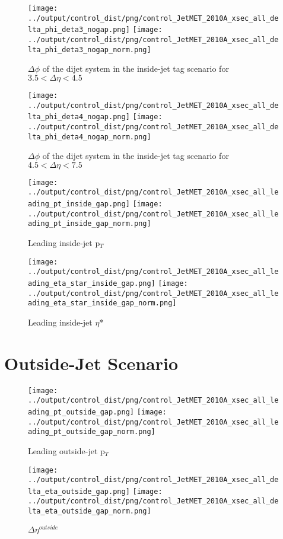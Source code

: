 \documentclass[11pt]{article}
\begin{document}
\begin{figure}[ht]
\centering
\texttt{[image: ../output/control\_dist/png/control\_JetMET\_2010A\_xsec\_all\_delta\_phi\_deta3\_nogap.png]}
\texttt{[image: ../output/control\_dist/png/control\_JetMET\_2010A\_xsec\_all\_delta\_phi\_deta3\_nogap\_norm.png]}
\caption{$\Delta\phi$ of the dijet system in the inside-jet tag scenario for $3.5 < \Delta\eta < 4.5$}
\label{fig:delta_nogap_deta3}
\end{figure}

\begin{figure}[ht]
\centering
\texttt{[image: ../output/control\_dist/png/control\_JetMET\_2010A\_xsec\_all\_delta\_phi\_deta4\_nogap.png]}
\texttt{[image: ../output/control\_dist/png/control\_JetMET\_2010A\_xsec\_all\_delta\_phi\_deta4\_nogap\_norm.png]}
\caption{$\Delta\phi$ of the dijet system in the inside-jet tag scenario for $4.5 < \Delta\eta < 7.5$}
\label{fig:delta_nogap_deta4}
\end{figure}


\begin{figure}[ht]
\centering
\texttt{[image: ../output/control\_dist/png/control\_JetMET\_2010A\_xsec\_all\_leading\_pt\_inside\_gap.png]}
\texttt{[image: ../output/control\_dist/png/control\_JetMET\_2010A\_xsec\_all\_leading\_pt\_inside\_gap\_norm.png]}
\caption{Leading inside-jet p$_{T}$ }
\label{fig:leading_pt_inside}
\end{figure}


\begin{figure}[ht]
\centering
\texttt{[image: ../output/control\_dist/png/control\_JetMET\_2010A\_xsec\_all\_leading\_eta\_star\_inside\_gap.png]}
\texttt{[image: ../output/control\_dist/png/control\_JetMET\_2010A\_xsec\_all\_leading\_eta\_star\_inside\_gap\_norm.png]}
\caption{Leading inside-jet $\eta$*}
\label{fig:leading_eta_inside}
\end{figure}

\clearpage


\section{Outside-Jet Scenario}

\begin{figure}[ht]
\centering
\texttt{[image: ../output/control\_dist/png/control\_JetMET\_2010A\_xsec\_all\_leading\_pt\_outside\_gap.png]}
\texttt{[image: ../output/control\_dist/png/control\_JetMET\_2010A\_xsec\_all\_leading\_pt\_outside\_gap\_norm.png]}
\caption{Leading outside-jet p$_{T}$ }
\label{fig:leading_pt_outside}
\end{figure}

\begin{figure}[ht]
\centering
\texttt{[image: ../output/control\_dist/png/control\_JetMET\_2010A\_xsec\_all\_delta\_eta\_outside\_gap.png]}
\texttt{[image: ../output/control\_dist/png/control\_JetMET\_2010A\_xsec\_all\_delta\_eta\_outside\_gap\_norm.png]}
\caption{$\Delta\eta^{outside}$}
\label{fig:delta_eta_outside}
\end{figure}

 
\end{document}

